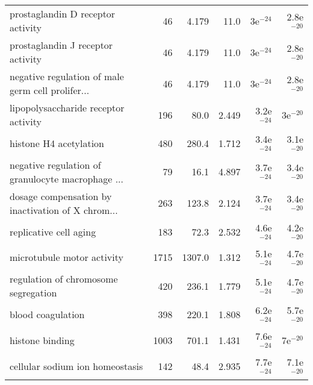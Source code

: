 \begin{longtable}{lrrrrr}
                 prostaglandin D receptor activity &                      46 &                   4.179 &       11.0 &           3e$^{-24}$ &         2.8e$^{-20}$ \\
                 prostaglandin J receptor activity &                      46 &                   4.179 &       11.0 &           3e$^{-24}$ &         2.8e$^{-20}$ \\
 negative regulation of male germ cell prolifer... &                      46 &                   4.179 &       11.0 &           3e$^{-24}$ &         2.8e$^{-20}$ \\
              lipopolysaccharide receptor activity &                     196 &                    80.0 &      2.449 &         3.2e$^{-24}$ &           3e$^{-20}$ \\
                            histone H4 acetylation &                     480 &                   280.4 &      1.712 &         3.4e$^{-24}$ &         3.1e$^{-20}$ \\
 negative regulation of granulocyte macrophage ... &                      79 &                    16.1 &      4.897 &         3.7e$^{-24}$ &         3.4e$^{-20}$ \\
 dosage compensation by inactivation of X chrom... &                     263 &                   123.8 &      2.124 &         3.7e$^{-24}$ &         3.4e$^{-20}$ \\
                            replicative cell aging &                     183 &                    72.3 &      2.532 &         4.6e$^{-24}$ &         4.2e$^{-20}$ \\
                        microtubule motor activity &                    1715 &                  1307.0 &      1.312 &         5.1e$^{-24}$ &         4.7e$^{-20}$ \\
              regulation of chromosome segregation &                     420 &                   236.1 &      1.779 &         5.1e$^{-24}$ &         4.7e$^{-20}$ \\
                                 blood coagulation &                     398 &                   220.1 &      1.808 &         6.2e$^{-24}$ &         5.7e$^{-20}$ \\
                                   histone binding &                    1003 &                   701.1 &      1.431 &         7.6e$^{-24}$ &           7e$^{-20}$ \\
                   cellular sodium ion homeostasis &                     142 &                    48.4 &      2.935 &         7.7e$^{-24}$ &         7.1e$^{-20}$ \\

\end{longtable}
